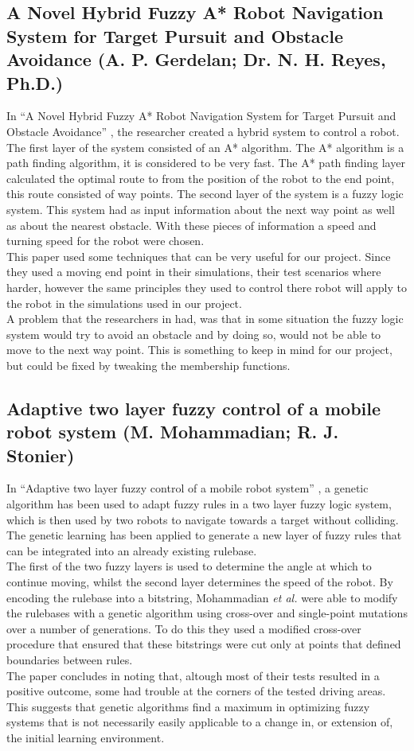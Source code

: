 \documentclass[conference]{IEEEtran}
\begin{document}
\subsection{A Novel Hybrid Fuzzy A* Robot Navigation System for Target Pursuit and Obstacle Avoidance (A. P. Gerdelan; Dr. N. H. Reyes, Ph.D.)}
In ``A Novel Hybrid Fuzzy A* Robot Navigation
System for Target Pursuit and Obstacle Avoidance'' \cite{hybridA*}, the researcher created a hybrid system to control a robot. The first layer of the system consisted of an A* algorithm. The A* algorithm is a path finding algorithm, it is considered to be very fast. The A* path finding layer calculated the optimal route to from the position of the robot to the end point, this route consisted of way points. The second layer of the system is a fuzzy logic system. This system had as input information about the next way point as well as about the nearest obstacle. With these pieces of information a speed and turning speed for the robot were chosen.\\
This paper used some techniques that can be very useful for our project. Since they used a moving end point in their simulations, their test scenarios where harder, however the same principles they used to control there robot will apply to the robot in the simulations used in our project.\\
A problem that the researchers in \cite{hybridA*} had, was that in some situation the fuzzy logic system would try to avoid an obstacle and by doing so, would not be able to move to the next way point. This is something to keep in mind for our project, but could be fixed by tweaking the membership functions.

\subsection{Adaptive two layer fuzzy control of a mobile robot system (M. Mohammadian; R. J. Stonier)}
In ``Adaptive two layer fuzzy control of a mobile robot system'' \cite{mohammadian1995adaptive}, a genetic algorithm has been used to adapt fuzzy rules in a two layer fuzzy logic system, which is then used by two robots to navigate towards a target without colliding.
The genetic learning has been applied to generate a new layer of fuzzy rules that can be integrated into an already existing rulebase.\\
The first of the two fuzzy layers is used to determine the angle at which to continue moving, whilst the second layer determines the speed of the robot. By encoding the rulebase into a bitstring, Mohammadian \textit{et al.} were able to modify the rulebases with a genetic algorithm using cross-over and single-point mutations over a number of generations. To do this they used a modified cross-over procedure that ensured that these bitstrings were cut only at points that defined boundaries between rules.\\
The paper concludes in noting that, altough most of their tests resulted in a positive outcome, some had trouble at the corners of the tested driving areas. This suggests that genetic algorithms find a maximum in optimizing fuzzy systems that is not necessarily easily applicable to a change in, or extension of, the initial learning environment.
\end{document}
